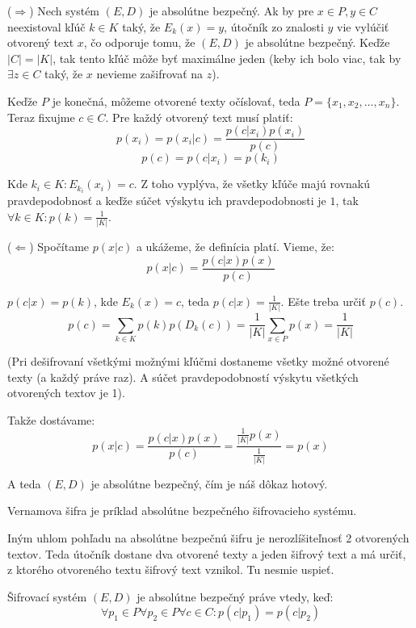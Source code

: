 \begin{dokaz}
($\Rightarrow$) Nech systém $(E,D)$ je absolútne bezpečný. Ak by pre $x \in P, y \in C$ neexistoval
kľúč $k \in K$ taký, že $E_k(x) = y$, útočník zo znalosti $y$ vie vylúčiť otvorený text $x$,
čo odporuje tomu, že $(E,D)$ je absolútne bezpečný. 
Keďže $|C|=|K|$, tak tento kľúč môže byť maximálne jeden (keby ich bolo viac, tak by $\exists z \in C$ taký, že
$x$ nevieme zašifrovať na $z$). 

Keďže $P$ je konečná, môžeme otvorené texty očíslovať, teda $P = \{ x_1, x_2, \dots, x_n\}$. 
Teraz fixujme $c \in C$. Pre každý otvorený text musí platiť:
$$p(x_i) = p(x_i | c) = \frac{p(c | x_i) p(x_i)}{p(c)}$$
$$p(c) = p(c | x_i) = p(k_i)$$

Kde $k_i \in K\colon E_{k_i}(x_i)=c$. Z toho vyplýva, že všetky kľúče majú rovnakú pravdepodobnosť a keďže
súčet výskytu ich pravdepodobnosti je $1$, tak $\forall k \in K\colon p(k) = \frac{1}{|K|}$.

($\Leftarrow$) Spočítame $p(x|c)$ a ukážeme, že definícia platí. Vieme, že:
$$p(x|c) = \frac{p(c|x)p(x)}{p(c)}$$

$p(c|x) = p(k)$, kde $E_k(x)=c$, teda $p(c|x) = \frac{1}{|K|}$. Ešte treba určiť $p(c)$.
$$p(c) = \displaystyle\sum_{k \in K} p(k)p(D_k(c)) = \frac{1}{|K|} \displaystyle\sum_{x \in P} p(x) = \frac{1}{|K|}$$

(Pri dešifrovaní všetkými možnými kľúčmi dostaneme všetky možné otvorené texty (a každý práve raz). A súčet pravdepodobností
výskytu všetkých otvorených textov je 1).

Takže dostávame:
$$p(x|c) = \frac{p(c|x)p(x)}{p(c)} = \frac{\frac{1}{|K|} p(x)}{\frac{1}{|K|}} = p(x)$$

A teda $(E,D)$ je absolútne bezpečný, čím je náš dôkaz hotový.

\end{dokaz}

\begin{priklad}
Vernamova šifra je príklad absolútne bezpečného šifrovacieho systému.
\end{priklad}

Iným uhlom pohľadu na absolútne bezpečnú šifru je nerozlíšiteľnosť 2 otvorených textov. 
Teda útočník dostane dva otvorené texty a jeden šifrový text a má určiť, z ktorého otvoreného
textu šifrový text vznikol. Tu nesmie uspieť.

\begin{veta}
Šifrovací systém $(E,D)$ je absolútne bezpečný práve vtedy, keď:
$$\forall p_1 \in P \forall p_2 \in P \forall c \in C\colon p(c|p_1)=p(c|p_2)$$
\end{veta}

